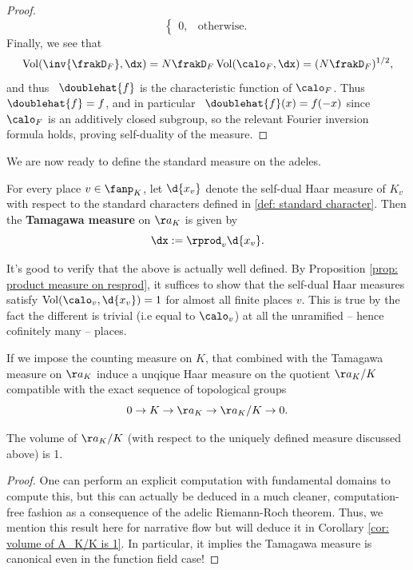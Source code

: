 \documentclass[11pt, x11names, openany]{book}
\begin{document}
\begin{proof}
\begin{equation*}
\begin{cases}
    0, & \text{otherwise}.
    \end{cases}
\end{equation*}
Finally, we see that
\begin{equation*}
    \vol(\inv{\frakD_F}, \dx) = N\frakD_F \vol(\calo_F, \dx) = (N \frakD_F)^{1/2},
\end{equation*}
and thus \ $\doublehat{f}$ is the characteristic function of $\calo_F$. Thus \ $\doublehat{f} = f$, and in particular \ $\doublehat{f}(x) = f(-x)$ since $\calo_F$ is an additively closed subgroup, so the relevant Fourier inversion formula holds, proving self-duality of the measure.
\end{proof}

We are now ready to define the standard measure on the adeles.
\begin{defn}
\label{def: Tamagawa measure}
For every place $v \in \fanp_K$, let $\d{x_v}$ denote the self-dual Haar measure of $K_v$ with respect to the standard characters defined in \ref{def: standard character}. Then the \textbf{Tamagawa measure} on $\aa_K$ is given by 
\begin{equation*}
    \dx := \rprod_v \d{x_v}.
\end{equation*}
\end{defn}

\begin{sanitycheck}
    It's good to verify that the above is actually well defined. By Proposition \ref{prop: product measure on resprod}, it suffices to show that the self-dual Haar measures satisfy $\vol(\calo_v, \d{x_v}) = 1$ for almost all finite places $v$. This is true by the fact the different is trivial (i.e equal to $\calo_v$) at all the unramified -- hence cofinitely many -- places.
\end{sanitycheck}

If we impose the counting measure on $K$, that combined with the Tamagawa measure on $\aa_K$ induce a unqique Haar measure on the quotient $\aa_K/K$ compatible with the exact sequence of topological groups
\begin{equation*}
    0 \to K \to \aa_K \to \aa_K/K \to 0.
\end{equation*}



\begin{theorem}
    \label{thm: volume of A_K/K = 1}
The volume of $\aa_K/K$ (with respect to the uniquely defined measure discussed above) is 1. 
\end{theorem}
\begin{proof}
One can perform an explicit computation with fundamental domains to compute this, but this can actually be deduced in a much cleaner, computation-free fashion as a consequence of the adelic Riemann-Roch theorem. Thus, we mention this result here for narrative flow but will deduce it in Corollary \ref{cor: volume of A_K/K is 1}. In particular, it implies the Tamagawa measure is canonical even in the function field case! 
\end{proof}
\end{document}

